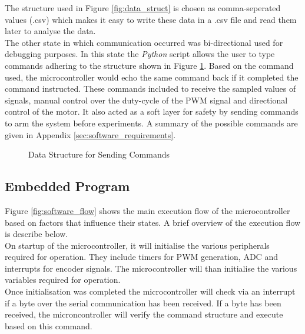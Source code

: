 The structure used in Figure \ref{fig:data_struct} is chosen as comma-seperated values (.csv) which makes it easy to write these data in a .csv file and read them later to analyse the data.\\

The other state in which communication occurred was bi-directional used for debugging purposes. In this state the \textit{Python} script allows the user to type commands adhering to the structure shown in Figure \ref{fig:uart_struct}. Based on the command used, the microcontroller would echo the same command back if it completed the command instructed. These commands included to receive the sampled values of signals, manual control over the duty-cycle of the PWM signal and directional control of the motor. It also acted as a soft layer for safety by sending commands to arm the system before experiments. A summary of the possible commands are given in Appendix \ref{sec:software_requirements}.


\begin{figure}[h]
	\centering
	
	\caption{Data Structure for Sending Commands}
	\label{fig:uart_struct}
\end{figure}


\subsection{Embedded Program}


Figure \ref{fig:software_flow} shows the main execution flow of the microcontroller based on factors that influence their states. A brief overview of the execution flow is describe below.\\

On startup of the microcontroller, it will initialise the various peripherals required for operation. They include timers for PWM generation, ADC and interrupts for encoder signals. The microcontroller will than initialise the various variables required for operation.\\

Once initialisation was completed the microcontroller will check via an interrupt if a byte over the serial communication has been received. If a byte has been received, the microncontroller will verify the command structure and execute based on this command.\\


